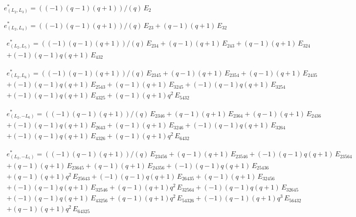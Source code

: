 $e^*_{(L_2, L_3)} = ((-1)(q-1)(q+1))/(q)\,E_{2}$

$e^*_{(L_2, L_4)} = ((-1)(q-1)(q+1))/(q)\,E_{23} + (q-1)(q+1)\,E_{32}$

\begin{multline*}
e^*_{(L_2, L_5)} = 
  ((-1)(q-1)(q+1))/(q)\,E_{234} + (q-1)(q+1)\,E_{243} + (q-1)(q+1)\,E_{324}
  \\
  + (-1)(q-1)q(q+1)\,E_{432}
\end{multline*}

\begin{multline*}
e^*_{(L_2, L_6)} = 
  ((-1)(q-1)(q+1))/(q)\,E_{2345} + (q-1)(q+1)\,E_{2354} + (q-1)(q+1)\,E_{2435}
  \\
  + (-1)(q-1)q(q+1)\,E_{2543} + (q-1)(q+1)\,E_{3245} + (-1)(q-1)q(q+1)\,E_{3254}
  \\
  + (-1)(q-1)q(q+1)\,E_{4325} + (q-1)(q+1)q^2\,E_{5432}
\end{multline*}

\begin{multline*}
e^*_{(L_2, -L_6)} = 
  ((-1)(q-1)(q+1))/(q)\,E_{2346} + (q-1)(q+1)\,E_{2364} + (q-1)(q+1)\,E_{2436}
  \\
  + (-1)(q-1)q(q+1)\,E_{2643} + (q-1)(q+1)\,E_{3246} + (-1)(q-1)q(q+1)\,E_{3264}
  \\
  + (-1)(q-1)q(q+1)\,E_{4326} + (q-1)(q+1)q^2\,E_{6432}
\end{multline*}

\begin{multline*}
e^*_{(L_2, -L_5)} = 
  ((-1)(q-1)(q+1))/(q)\,E_{23456} + (q-1)(q+1)\,E_{23546} + (-1)(q-1)q(q+1)\,E_{23564}
  \\
  + (q-1)(q+1)\,E_{23645} + (q-1)(q+1)\,E_{24356} + (-1)(q-1)q(q+1)\,E_{25436}
  \\
  + (q-1)(q+1)q^2\,E_{25643} + (-1)(q-1)q(q+1)\,E_{26435} + (q-1)(q+1)\,E_{32456}
  \\
  + (-1)(q-1)q(q+1)\,E_{32546} + (q-1)(q+1)q^2\,E_{32564} + (-1)(q-1)q(q+1)\,E_{32645}
  \\
  + (-1)(q-1)q(q+1)\,E_{43256} + (q-1)(q+1)q^2\,E_{54326} + (-1)(q-1)(q+1)q^3\,E_{56432}
  \\
  + (q-1)(q+1)q^2\,E_{64325}
\end{multline*}


